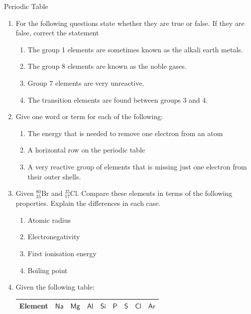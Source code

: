 \begin{eocexercises}{ Periodic Table}
            \nopagebreak \noindent
\label{m38757*uid091221}\begin{enumerate}[noitemsep, label=\textbf{\arabic*}. ] 
\item For the following questions state whether they are true or false. If they are false, correct the statement
  \label{m38757*id073324}\begin{enumerate}[noitemsep, label=\textbf{\alph*}. ] 
  \item The group 1 elements are sometimes known as the alkali earth metals.
  \item The group 8 elements are known as the noble gases.
  \item Group 7 elements are very unreactive.
  \item The transition elements are found between groups 3 and 4.\end{enumerate}
\item Give one word or term for each of the following:
   \label{m38757*id0734}\begin{enumerate}[noitemsep, label=\textbf{\alph*}. ] 
   \item The energy that is needed to remove one electron from an atom
   \item A horizontal row on the periodic table
   \item A very reactive group of elements that is missing just one electron from their outer shells.
   \end{enumerate}
\item Given $^{80}_{35}\text{Br}$ and $^{35}_{17}\text{Cl}$. Compare these elements in terms of the following properties. Explain the differences in each case.
  \begin{enumerate}[noitemsep, label=\textbf{\alph*}. ]
   \item Atomic radius
   \item Electronegativity
   \item First ionisation energy
   \item Boiling point
  \end{enumerate}
\item Given the following table:
  \begin{table}[H]
   \begin{center}
    \begin{tabular}{|l|l|l|l|l|l|l|l|l|} \hline
     \textbf{Element} & $\textsf{Na}$ & $\textsf{Mg}$ & $\textsf{Al}$ & $\textsf{Si}$ & $\textsf{P}$ & $\textsf{S}$ & $\textsf{Cl}$ & $\textsf{Ar}$ \\ \hline

\end{tabular}
\end{center}
\end{table}
\end{enumerate}
\end{eocexercises}
